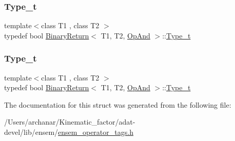 \mbox{\label{structBinaryReturn_3_01T1_00_01T2_00_01OpAnd_01_4_a8eacc4b4e150e0f58ff37e1e48ff0649}} 
\subsubsection{\texorpdfstring{Type\_t}{Type\_t}\hspace{0.1cm}{\footnotesize\ttfamily [2/3]}}
{\footnotesize\ttfamily template$<$class T1 , class T2 $>$ \\
typedef bool \mbox{\hyperlink{structBinaryReturn}{Binary\+Return}}$<$ T1, T2, \mbox{\hyperlink{structOpAnd}{Op\+And}} $>$\+::\mbox{\hyperlink{structBinaryReturn_3_01T1_00_01T2_00_01OpAnd_01_4_a8eacc4b4e150e0f58ff37e1e48ff0649}{Type\+\_\+t}}}

\mbox{\label{structBinaryReturn_3_01T1_00_01T2_00_01OpAnd_01_4_a8eacc4b4e150e0f58ff37e1e48ff0649}} 
\subsubsection{\texorpdfstring{Type\_t}{Type\_t}\hspace{0.1cm}{\footnotesize\ttfamily [3/3]}}
{\footnotesize\ttfamily template$<$class T1 , class T2 $>$ \\
typedef bool \mbox{\hyperlink{structBinaryReturn}{Binary\+Return}}$<$ T1, T2, \mbox{\hyperlink{structOpAnd}{Op\+And}} $>$\+::\mbox{\hyperlink{structBinaryReturn_3_01T1_00_01T2_00_01OpAnd_01_4_a8eacc4b4e150e0f58ff37e1e48ff0649}{Type\+\_\+t}}}



The documentation for this struct was generated from the following file\+:\begin{DoxyCompactItemize}
\item 
/\+Users/archanar/\+Kinematic\+\_\+factor/adat-\/devel/lib/ensem/\mbox{\hyperlink{adat-devel_2lib_2ensem_2ensem__operator__tags_8h}{ensem\+\_\+operator\+\_\+tags.\+h}}\end{DoxyCompactItemize}
